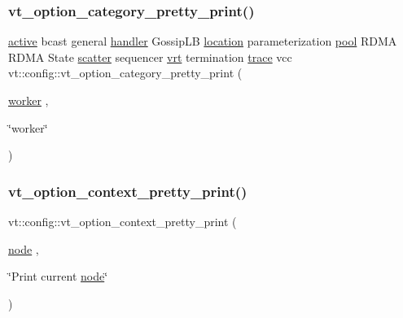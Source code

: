 \subsubsection{\texorpdfstring{vt\+\_\+option\+\_\+category\+\_\+pretty\+\_\+print()}{vt\_option\_category\_pretty\_print()}\hspace{0.1cm}{\footnotesize\ttfamily [16/16]}}
{\footnotesize\ttfamily \hyperlink{namespacevt_1_1config_a6bd1d6215bda0d8ca02811798399f689a82f77c67af0c363709010c6df4dbd920}{active} bcast general \hyperlink{namespacevt_1_1config_a6bd1d6215bda0d8ca02811798399f689a82a0081a94d5c5dfd18b0b3f7eca64b7}{handler} Gossip\+LB \hyperlink{namespacevt_1_1config_a6bd1d6215bda0d8ca02811798399f689aa8d8501591ca3859c828489054b17640}{location} parameterization \hyperlink{namespacevt_1_1config_a6bd1d6215bda0d8ca02811798399f689a50ba0efa092380eb92cee1d921d6e40f}{pool} R\+D\+MA R\+D\+MA State \hyperlink{namespacevt_1_1config_a6bd1d6215bda0d8ca02811798399f689ab0821d060501c20d94b8d700df7fdd76}{scatter} sequencer \hyperlink{namespacevt_1_1config_a6bd1d6215bda0d8ca02811798399f689a012d139c89a14e56a85f32fd82e7c7d3}{vrt} termination \hyperlink{namespacevt_1_1config_a6bd1d6215bda0d8ca02811798399f689aa14cb3132cde2e74239755b4c3944f43}{trace} vcc vt\+::config\+::vt\+\_\+option\+\_\+category\+\_\+pretty\+\_\+print (\begin{DoxyParamCaption}\item[{\hyperlink{namespacevt_1_1config_a6bd1d6215bda0d8ca02811798399f689a24771d4179e70d6e207872dbca07e2ef}{worker}}]{,  }\item[{\char`\"{}worker\char`\"{}}]{ }\end{DoxyParamCaption})}

\mbox{\label{namespacevt_1_1config_a7318827247b6fe5313529e7c8b2a9a28}} 
\subsubsection{\texorpdfstring{vt\+\_\+option\+\_\+context\+\_\+pretty\+\_\+print()}{vt\_option\_context\_pretty\_print()}}
{\footnotesize\ttfamily vt\+::config\+::vt\+\_\+option\+\_\+context\+\_\+pretty\+\_\+print (\begin{DoxyParamCaption}\item[{\hyperlink{namespacevt_1_1config_a46e57c33bee1b9f1fa95455af86d80e0a576033c81e2ddd03d721ecef3b1b3f81}{node}}]{,  }\item[{\char`\"{}Print current \hyperlink{namespacevt_1_1config_a46e57c33bee1b9f1fa95455af86d80e0a576033c81e2ddd03d721ecef3b1b3f81}{node}\char`\"{}}]{ }\end{DoxyParamCaption})}

